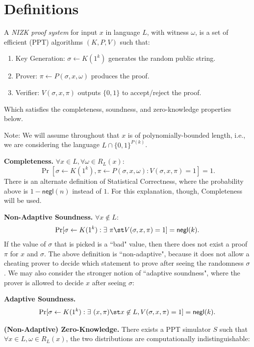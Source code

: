 \section{Definitions}

\begin{definition}
    A \emph{NIZK proof system} for input $x$ in language $L$, with witness $\omega$, is a set of
efficient (PPT) algorithms $(K, P, V)$ such that:
\begin{enumerate}
    \item Key Generation: $\sigma \gets K(1^k)$ generates the random public string.
    \item Prover: $\pi \gets P(\sigma, x, \omega)$ produces the proof.
    \item Verifier: $V(\sigma, x, \pi)$ outputs $\{0, 1\}$ to accept/reject the proof.
\end{enumerate}
Which satisfies the completeness, soundness, and zero-knowledge properties below.
\end{definition}
Note: We will assume throughout that $x$ is of polynomially-bounded length, i.e., we are
considering the language $L \cap \{0, 1\}^{P(k)}$.


\medskip
\noindent\textbf{Completeness.} $\forall x \in L, \forall \omega \in R_L(x)$:
    $$\Pr[\sigma \gets K(1^k), \pi \gets P(\sigma, x, \omega) : V(\sigma, x,
    \pi) = 1] = 1.$$
There is an alternate definition of Statistical Correctness, where the probability above is $1 - \mathsf{negl}(n)$ instead of $1$. For this explanation, though, Completeness will be used.

\medskip
\noindent\textbf{Non-Adaptive Soundness.} $\forall x \not\in L$:
    $$\Pr[\sigma \gets K(1^k): \exists~\pi \st V(\sigma, x, \pi)
    = 1] = \mathsf{negl}(k).$$
If the value of $\sigma$ that is picked is a ``bad" value, then there does not exist a proof $\pi$ for $x$ and $\sigma$. The above definition is ``non-adaptive", because it does not allow a cheating
prover to decide which statement to prove after seeing the randomness $\sigma$.
We may also consider the stronger notion of ``adaptive soundness", where the
prover is allowed to decide $x$ after seeing $\sigma$:

\medskip
\noindent\textbf{Adaptive Soundness.}
    $$\Pr[\sigma \gets K(1^k): \exists~ (x, \pi) \st  x \not\in L, V(\sigma, x, \pi)
    = 1] = \mathsf{negl}(k).$$
    
\medskip
\noindent\textbf{(Non-Adaptive) Zero-Knowledge.}
    There exists a PPT simulator $S$ such that $\forall x \in L, \omega \in
    R_L(x)$, the two distributions are computationally indistinguishable:

